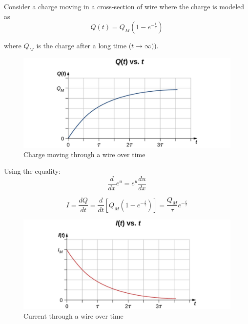 \documentclass[14pt]{memoir}
\begin{document}
Consider a charge moving in a cross-section of wire where the charge is modeled as
\begin{equation}
Q(t) = Q_M (1 - e^{-\frac{t}{\tau}})
\end{equation}

where $Q_M$ is the charge after a long time ($t \rightarrow \infty)$).

\begin{figure}[H]
\begin{center}
\includegraphics[scale=0.50]{fig/fig_09_03.jpg}
\caption{Charge moving through a wire over time}
\label{fig:09_03}
\end{center}
\end{figure}

Using the equality:
\begin{equation}
\frac{d}{dx} e^u = e^u \frac{du}{dx}
\end{equation}

\begin{equation}
I = \frac{dQ}{dt} = \frac{d}{dt}[Q_M (1 - e^{-\frac{t}{\tau}})] = \frac{Q_M}{\tau} e^{-\frac{t}{\tau}}
\end{equation}

\begin{figure}[H]
\begin{center}
\includegraphics[scale=0.50]{fig/fig_09_04.jpg}
\caption{Current through a wire over time}
\label{fig:09_04}
\end{center}
\end{figure}
\end{document}
